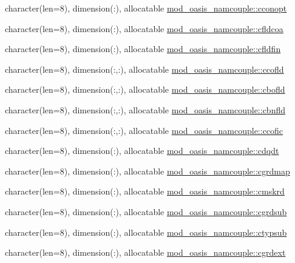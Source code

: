 \begin{DoxyCompactItemize}
character(len=8), dimension(\+:), allocatable \hyperlink{namespacemod__oasis__namcouple_a240979dfe7369da899b0cfe2aeba4f9d}{mod\+\_\+oasis\+\_\+namcouple\+::cconopt}
\item 
character(len=8), dimension(\+:), allocatable \hyperlink{namespacemod__oasis__namcouple_af3a308fee2e4b00a1380035e41113d36}{mod\+\_\+oasis\+\_\+namcouple\+::cfldcoa}
\item 
character(len=8), dimension(\+:), allocatable \hyperlink{namespacemod__oasis__namcouple_aa387fcfde8c2538e22897b243ff5024c}{mod\+\_\+oasis\+\_\+namcouple\+::cfldfin}
\item 
character(len=8), dimension(\+:,\+:), allocatable \hyperlink{namespacemod__oasis__namcouple_af8d81a53bd28ddf6bfe19f5e05f1d867}{mod\+\_\+oasis\+\_\+namcouple\+::ccofld}
\item 
character(len=8), dimension(\+:,\+:), allocatable \hyperlink{namespacemod__oasis__namcouple_ab0f93bb917e445dc4e55fc2326168a42}{mod\+\_\+oasis\+\_\+namcouple\+::cbofld}
\item 
character(len=8), dimension(\+:,\+:), allocatable \hyperlink{namespacemod__oasis__namcouple_af5bfb0fe58a77461130b9967fa7a4d5e}{mod\+\_\+oasis\+\_\+namcouple\+::cbnfld}
\item 
character(len=8), dimension(\+:,\+:), allocatable \hyperlink{namespacemod__oasis__namcouple_a009543dda4495ab9b5ac3fcf15767682}{mod\+\_\+oasis\+\_\+namcouple\+::ccofic}
\item 
character(len=8), dimension(\+:), allocatable \hyperlink{namespacemod__oasis__namcouple_a9c5a3b3a864f3feb95eddc08616b998e}{mod\+\_\+oasis\+\_\+namcouple\+::cdqdt}
\item 
character(len=8), dimension(\+:), allocatable \hyperlink{namespacemod__oasis__namcouple_affa01947af89e5cdad5f33fba2a53d22}{mod\+\_\+oasis\+\_\+namcouple\+::cgrdmap}
\item 
character(len=8), dimension(\+:), allocatable \hyperlink{namespacemod__oasis__namcouple_a28c3f9e076a686c8ef916221e8fe4e10}{mod\+\_\+oasis\+\_\+namcouple\+::cmskrd}
\item 
character(len=8), dimension(\+:), allocatable \hyperlink{namespacemod__oasis__namcouple_ac7f3cff3406912fe6e48c3cc7cf5436b}{mod\+\_\+oasis\+\_\+namcouple\+::cgrdsub}
\item 
character(len=8), dimension(\+:), allocatable \hyperlink{namespacemod__oasis__namcouple_ad8f8aca3a6fa885e4edf027b79a93305}{mod\+\_\+oasis\+\_\+namcouple\+::ctypsub}
\item 
character(len=8), dimension(\+:), allocatable \hyperlink{namespacemod__oasis__namcouple_a5db101d0bffaf6fbd5ae10d1d0069108}{mod\+\_\+oasis\+\_\+namcouple\+::cgrdext}

\end{DoxyCompactItemize}

